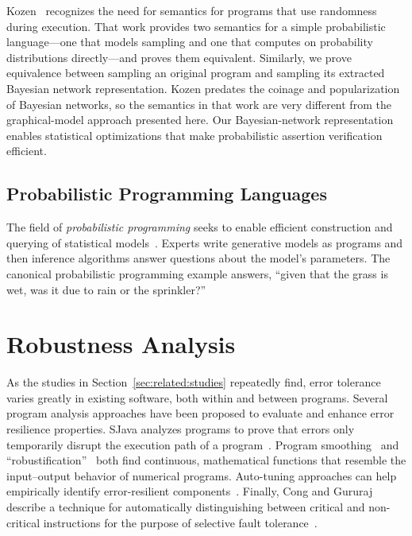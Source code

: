 Kozen~\cite{kozen} recognizes the need for semantics for programs
that use randomness during execution.
That work provides two semantics for a simple probabilistic
language---one that models sampling and one that computes on probability
distributions directly---and proves them equivalent.
Similarly, we prove equivalence between sampling an original program and
sampling its extracted Bayesian network representation.
Kozen predates the coinage and popularization of Bayesian networks, so
the semantics in that work are very different from the graphical-model approach
presented here.
Our Bayesian-network representation enables statistical optimizations that
make probabilistic assertion verification efficient.

\subsection{Probabilistic Programming Languages}

The field of \emph{probabilistic programming} seeks to enable efficient
construction and querying of statistical models~\cite{BBGR13, wingate-lightweight,
  church, chaganty, pfeffersample, probdsl, koller}.  Experts write
generative models as programs and then inference algorithms answer questions
about the model's parameters. The canonical probabilistic programming example
answers, ``given that the grass is wet, was it due to rain or the sprinkler?''




\section{Robustness Analysis}

As the studies in Section~\ref{sec:related:studies} repeatedly find, error
tolerance varies greatly in existing software, both within and between
programs. Several program analysis approaches have been proposed to evaluate
and enhance error resilience properties. SJava analyzes programs to prove that
errors only temporarily disrupt the execution path of a program~\cite{sjava}.
Program smoothing~\cite{smoothing-cav, smoothing-pldi, smoothing-fse} and
``robustification''~\cite{robustification} both find continuous, mathematical
functions that resemble the input--output behavior of numerical programs.
Auto-tuning approaches can help empirically identify error-resilient
components~\cite{asac}.
Finally, Cong and Gururaj describe a technique for automatically
distinguishing between critical and non-critical instructions for the purpose
of selective fault tolerance~\cite{cong-iccad}.
